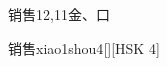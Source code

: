 \begin{entry}{销售}{12,11}{⾦、⼝}
  \begin{phonetics}{销售}{xiao1shou4}[][HSK 4]
  \end{phonetics}
\end{entry}
